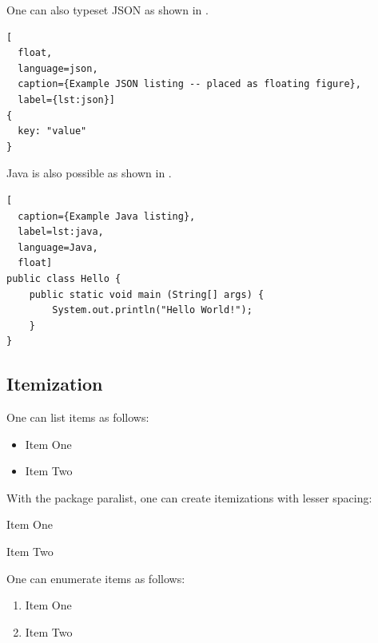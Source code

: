 One can also typeset JSON as shown in .

\begin{ltgexample}
\begin{lstlisting}[
  float,
  language=json,
  caption={Example JSON listing -- placed as floating figure},
  label={lst:json}]
{
  key: "value"
}
\end{lstlisting}
\end{ltgexample}

Java is also possible as shown in .

\begin{ltgexample}
\begin{lstlisting}[
  caption={Example Java listing},
  label=lst:java,
  language=Java,
  float]
public class Hello {
    public static void main (String[] args) {
        System.out.println("Hello World!");
    }
}
\end{lstlisting}
\end{ltgexample}

\subsection{Itemization}

One can list items as follows:

\begin{ltgexample}
\begin{itemize}
  \item Item One
  \item Item Two
\end{itemize}
\end{ltgexample}

With the package paralist, one can create itemizations with lesser spacing:

\begin{ltgexample}
\begin{compactitem}
  \item Item One
  \item Item Two
\end{compactitem}
\end{ltgexample}

One can enumerate items as follows:

\begin{ltgexample}
\begin{enumerate}
  \item Item One
  \item Item Two
\end{enumerate}
\end{ltgexample}

